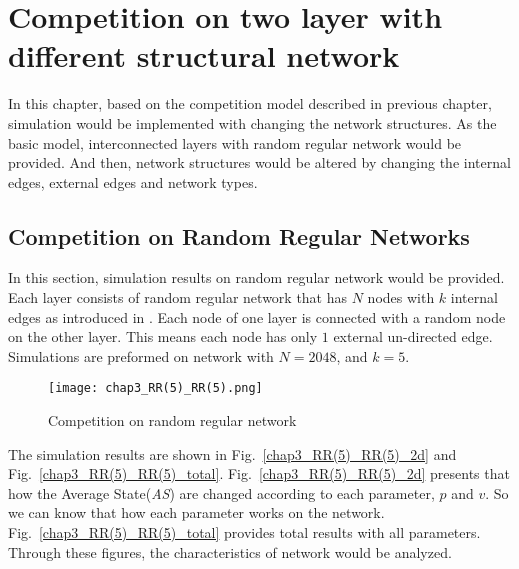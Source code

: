 

\chapter{Competition on two layer with different structural network}
\label{chap:competition on two layer with different structural network}
In this chapter, based on the competition model described in previous chapter, simulation would be implemented with changing the network structures. As the basic model, interconnected layers with random regular network would be provided. And then,  network structures would be altered by changing the internal edges, external edges and network types. 

\section{Competition on Random Regular Networks}
\label{competition on Random Regular Networks}
In this section, simulation results on random regular network would be provided. Each layer consists of random regular network that has $N$ nodes with $k$ internal edges as introduced in \cite{kimsangwoo2012, bela2001}. Each node of one layer is connected with a random node on the other layer. This means each node has only $1$ external un-directed edge. Simulations are preformed on network with $N=2048$, and $k = 5$. 
\begin{figure*}[!htb]
	\centering
	\texttt{[image: chap3\_RR(5)\_RR(5).png]}
	\caption{Competition on random regular network}
	\label{chap3_RR(5)_RR(5)}
\end{figure*}


The simulation results are shown in Fig.~\ref{chap3_RR(5)_RR(5)_2d} and Fig.~\ref{chap3_RR(5)_RR(5)_total}.  Fig.~\ref{chap3_RR(5)_RR(5)_2d} presents that how the Average State(\textit{AS}) are changed according to each parameter, $p$ and $v$. So we can know that how each parameter works on the network. Fig.~\ref{chap3_RR(5)_RR(5)_total} provides total results with all parameters. Through these figures, the characteristics of network would be analyzed.

